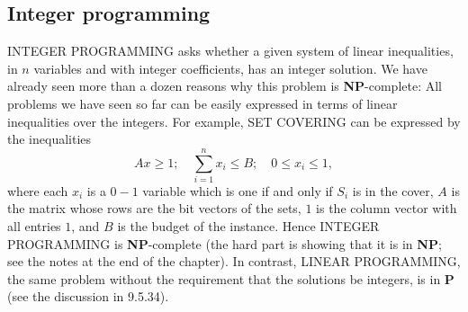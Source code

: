 \documentclass[12pt]{article}
\begin{document}
\subsection{Integer programming}
\textsc{INTEGER PROGRAMMING} asks whether a given system of linear inequalities, in $n$ variables and with integer coefficients, has an integer solution. We have already seen more than a dozen reasons why this problem is \textbf{NP}-complete: All problems we have seen so far can be easily expressed in terms of linear inequalities over the integers. For example, \textsc{SET COVERING} can be expressed by the inequalities 
\[
Ax \geq 1; \quad \sum_{i=1}^n x_i \leq B; \quad 0 \leq x_i \leq 1,
\]
where each $x_i$ is a $0 - 1$ variable which is one if and only if $S_i$ is in the cover, $A$ is the matrix whose rows are the bit vectors of the sets, $1$ is the column vector with all entries $1$, and $B$ is the budget of the instance. Hence \textsc{INTEGER PROGRAMMING} is \textbf{NP}-complete (the hard part is showing that it is in \textbf{NP}; see the notes at the end of the chapter). In contrast, \textsc{LINEAR PROGRAMMING}, the same problem without the requirement that the solutions be integers, is in \textbf{P} (see the discussion in 9.5.34).
\end{document}
